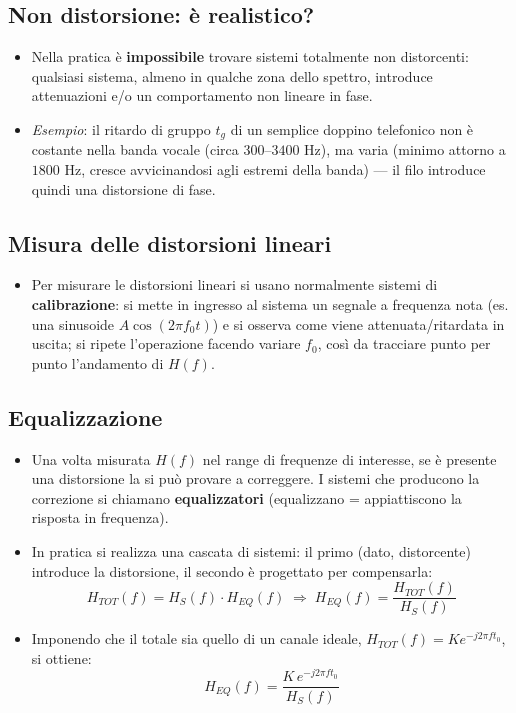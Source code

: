 \documentclass[12pt, a4paper]{article}
\begin{document}
\subsection{Non distorsione: è realistico?}
\begin{itemize}
    \item Nella pratica è \textbf{impossibile} trovare sistemi totalmente non distorcenti: qualsiasi sistema, almeno in qualche zona dello spettro, introduce attenuazioni e/o un comportamento non lineare in fase.
    \item \textit{Esempio}: il ritardo di gruppo $t_g$ di un semplice doppino telefonico non è costante nella banda vocale (circa $300$--$3400$ Hz), ma varia (minimo attorno a $1800$ Hz, cresce avvicinandosi agli estremi della banda) — il filo introduce quindi una distorsione di fase.
\end{itemize}

\subsection{Misura delle distorsioni lineari}
\begin{itemize}
    \item Per misurare le distorsioni lineari si usano normalmente sistemi di \textbf{calibrazione}: si mette in ingresso al sistema un segnale a frequenza nota (es. una sinusoide $A\cos(2\pi f_0t)$) e si osserva come viene attenuata/ritardata in uscita; si ripete l'operazione facendo variare $f_0$, così da tracciare punto per punto l'andamento di $H(f)$.
\end{itemize}

\subsection{Equalizzazione}
\begin{itemize}
    \item Una volta misurata $H(f)$ nel range di frequenze di interesse, se è presente una distorsione la si può provare a correggere. I sistemi che producono la correzione si chiamano \textbf{equalizzatori} (equalizzano = appiattiscono la risposta in frequenza).
    \item In pratica si realizza una cascata di sistemi: il primo (dato, distorcente) introduce la distorsione, il secondo è progettato per compensarla:
    $$H_{TOT}(f) = H_S(f)\cdot H_{EQ}(f) \;\Longrightarrow\; H_{EQ}(f) = \frac{H_{TOT}(f)}{H_S(f)}$$
    \item Imponendo che il totale sia quello di un canale ideale, $H_{TOT}(f)=Ke^{-j2\pi ft_0}$, si ottiene:
    $$H_{EQ}(f) = \frac{K\,e^{-j2\pi ft_0}}{H_S(f)}$$
\end{itemize}
\end{document}
